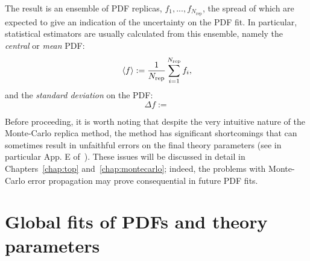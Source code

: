 \documentclass[withindex,glossary]{cam-thesis}
\begin{document}
The result is an ensemble of PDF replicas, $f_1,..., f_{N_{\text{rep}}}$, the spread of which are expected to give an indication of the uncertainty on the PDF fit. In particular, statistical estimators are usually calculated from this ensemble, namely the \textit{central} or \textit{mean} PDF:
\begin{equation}
\braket{f} := \frac{1}{N_{\text{rep}}}\sum_{i=1}^{N_{\text{rep}}} f_i,
\end{equation}
and the \textit{standard deviation} on the PDF:
\begin{equation}
\Delta f := 
\end{equation}

Before proceeding, it is worth noting that despite the very intuitive nature of the Monte-Carlo replica method, the method has significant shortcomings that can sometimes result in unfaithful errors on the final theory parameters (see in particular App. E of~\cite{Kassabov:2023hbm}). These issues will be discussed in detail in Chapters~\ref{chap:top} and~\ref{chap:montecarlo}; indeed, the problems with Monte-Carlo error propagation may prove consequential in future PDF fits.




\newpage
\section{Global fits of PDFs and theory parameters}
\label{sec:globalfits}
\end{document}
